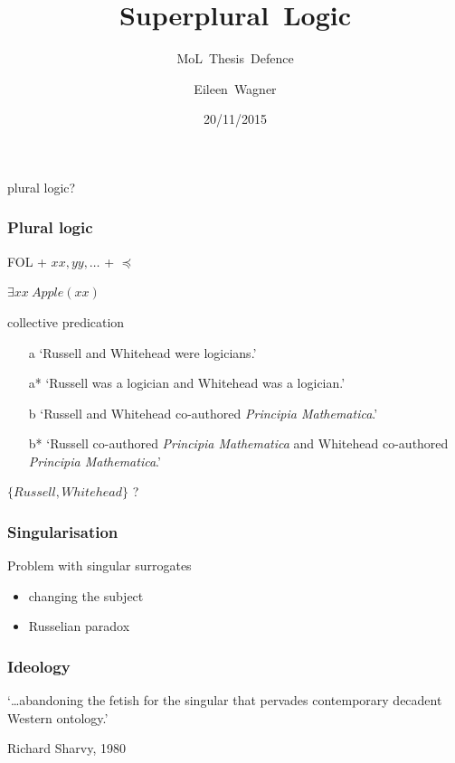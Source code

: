 \documentclass[serif]{beamer}
\title[title]
{Superplural~Logic}
\subtitle{MoL~Thesis~Defence}
\author{Eileen~Wagner}
\date{20/11/2015}
\renewenvironment{quote}
  {\begin{trivlist} \setlength\leftskip{0cm} \setlength\rightskip{0pt}
   \item\relax}
  {\end{trivlist}}
\newcommand{\among}{\preccurlyeq}
\begin{document}
\frame{\titlepage}

\begin{frame}
\frametitle{}

plural logic?

\end{frame}

\begin{frame}
\frametitle{Plural logic}

FOL \pause + $xx, yy, \dots$ \pause + $\among$
\pause

$\exists xx ~ \mathit{Apple}(xx)$

\pause
\begin{block}{collective predication}\pause
\begin{enumerate}[<+->]
  \item[a] `Russell and Whitehead were logicians.'
  \item[a*] `Russell was a logician and Whitehead was a logician.'
  \item[b] `Russell and Whitehead co-authored \emph{Principia Mathematica}.'
  \item[b*]  `Russell co-authored \emph{Principia Mathematica} and Whitehead co-authored \emph{Principia Mathematica}.'
  \end{enumerate}
\end{block}
\pause
$\{ \mathit{Russell}, \mathit{Whitehead}\}$ ?
\end{frame}

\begin{frame}
\frametitle{Singularisation}

Problem with \alert{singular surrogates}
\medskip

\begin{itemize}
  \item changing the subject
  \item Russelian paradox
\end{itemize}

\end{frame}

\begin{frame}
\frametitle{Ideology}

\begin{quote}
  `\dots abandoning the fetish for the singular that pervades contemporary decadent Western ontology.'
\end{quote}
{\raggedleft\footnotesize Richard Sharvy, 1980\par}
\end{frame}
\end{document}
